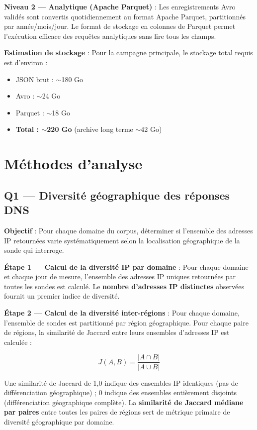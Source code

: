 \textbf{Niveau 2 --- Analytique (Apache Parquet)} : Les enregistrements Avro validés sont convertis quotidiennement au format Apache Parquet, partitionnés par année/mois/jour. Le format de stockage en colonnes de Parquet permet l'exécution efficace des requêtes analytiques sans lire tous les champs.

\textbf{Estimation de stockage} : Pour la campagne principale, le stockage total requis est d'environ :
\begin{itemize}
  \item JSON brut : $\sim$180 Go
  \item Avro : $\sim$24 Go
  \item Parquet : $\sim$18 Go
  \item \textbf{Total : $\sim$220 Go} (archive long terme $\sim$42 Go)
\end{itemize}

\bigskip
\section{Méthodes d'analyse}
\label{sec:3.5}

\subsection{Q1 --- Diversité géographique des réponses DNS}
\label{subsec:3.5.1}

\textbf{Objectif} : Pour chaque domaine du corpus, déterminer si l'ensemble des adresses IP retournées varie systématiquement selon la localisation géographique de la sonde qui interroge.

\textbf{Étape 1 --- Calcul de la diversité IP par domaine} : Pour chaque domaine et chaque jour de mesure, l'ensemble des adresses IP uniques retournées par toutes les sondes est calculé. Le \textbf{nombre d'adresses IP distinctes} observées fournit un premier indice de diversité.

\textbf{Étape 2 --- Calcul de la diversité inter-régions} : Pour chaque domaine, l'ensemble de sondes est partitionné par région géographique. Pour chaque paire de régions, la similarité de Jaccard entre leurs ensembles d'adresses IP est calculée :

\[
J(A, B) = \frac{|A \cap B|}{|A \cup B|}
\]

Une similarité de Jaccard de 1,0 indique des ensembles IP identiques (pas de différenciation géographique) ; 0 indique des ensembles entièrement disjoints (différenciation géographique complète). La \textbf{similarité de Jaccard médiane par paires} entre toutes les paires de régions sert de métrique primaire de diversité géographique par domaine.

